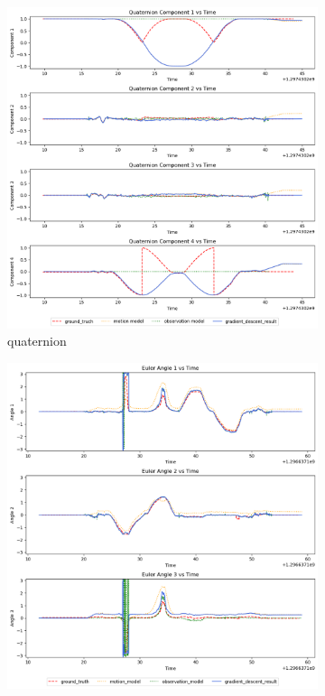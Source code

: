 \documentclass[conference]{IEEEtran}
\begin{document}
\begin{figure}[h]
    \centering
    \begin{subfigure}{0.4\textwidth}
        \includegraphics[width=\linewidth]{../img/8_qt.png}
        \caption{quaternion}
        \label{fig:8qt}
    \end{subfigure}
    \hfill
    \begin{subfigure}{0.4\textwidth}
        \includegraphics[width=\linewidth]{../img/2_ea.png}

\end{subfigure}
\end{figure}
\end{document}
